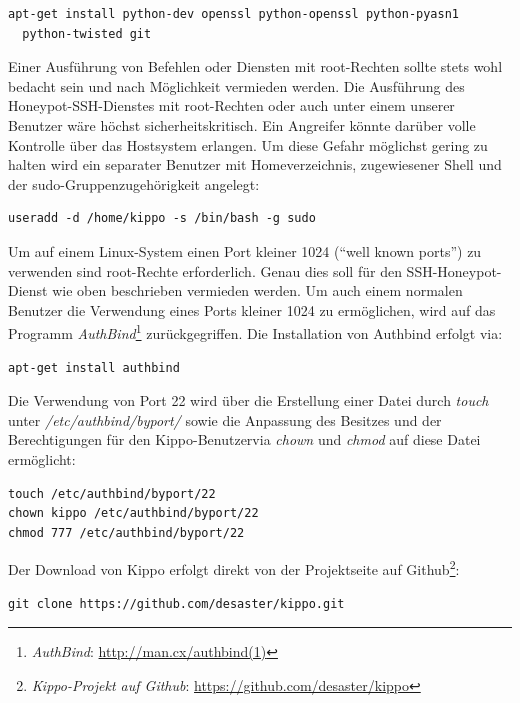 \begin{lstlisting}[style=customc]
apt-get install python-dev openssl python-openssl python-pyasn1 
  python-twisted git
\end{lstlisting}

Einer Ausführung von Befehlen oder Diensten mit root-Rechten sollte stets wohl bedacht sein und nach Möglichkeit vermieden werden. Die Ausführung des Honeypot-SSH-Dienstes mit root-Rechten oder auch unter einem unserer Benutzer wäre höchst sicherheitskritisch. Ein Angreifer könnte darüber volle Kontrolle über das Hostsystem erlangen. Um diese Gefahr möglichst gering zu halten wird ein separater Benutzer mit Homeverzeichnis, zugewiesener Shell und der sudo-Gruppenzugehörigkeit angelegt:

\begin{lstlisting}[style=customc]
useradd -d /home/kippo -s /bin/bash -g sudo
\end{lstlisting}

Um auf einem Linux-System einen Port kleiner 1024 ("`well known ports"') zu verwenden sind root-Rechte erforderlich. Genau dies soll für den SSH-Honeypot-Dienst wie oben beschrieben vermieden werden. Um auch einem normalen Benutzer die Verwendung eines Ports kleiner 1024 zu ermöglichen, wird auf das Programm \textit{AuthBind}\footnote{ \textit{AuthBind}: \url{http://man.cx/authbind(1)}} zurückgegriffen. Die Installation von Authbind erfolgt via:

\begin{lstlisting}[style=customc]
apt-get install authbind
\end{lstlisting}

Die Verwendung von Port 22 wird über die Erstellung einer Datei durch \textit{touch} unter \textit{/etc/authbind/byport/} sowie die Anpassung des Besitzes und der Berechtigungen für den Kippo-Benutzervia \textit{chown} und \textit{chmod} auf diese Datei ermöglicht:

\begin{lstlisting}[style=customc]
touch /etc/authbind/byport/22
chown kippo /etc/authbind/byport/22
chmod 777 /etc/authbind/byport/22
\end{lstlisting}

Der Download von Kippo erfolgt direkt von der Projektseite auf Github\footnote{ \textit{Kippo-Projekt auf Github}: \url{https://github.com/desaster/kippo}}:

\begin{lstlisting}[style=customc]
git clone https://github.com/desaster/kippo.git
\end{lstlisting}


